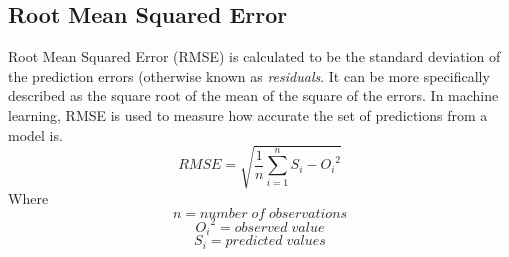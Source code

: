 \subsection{Root Mean Squared Error}
Root Mean Squared Error (RMSE) is calculated to be the standard deviation of the prediction errors (otherwise known as \textit{residuals}. It can be more specifically described as the square root of the mean of the square of the errors. In machine learning, RMSE is used to measure how accurate the set of predictions from a model is. \cite{RMSE}
$$RMSE = \sqrt{\frac{1}{n}\sum_{i=1}^n S_i - {O_i}^2}$$
Where 
$$n = number\; of \; observations$$
$${O_i}^2 = observed\; value$$
$$S_i = predicted \; values$$
